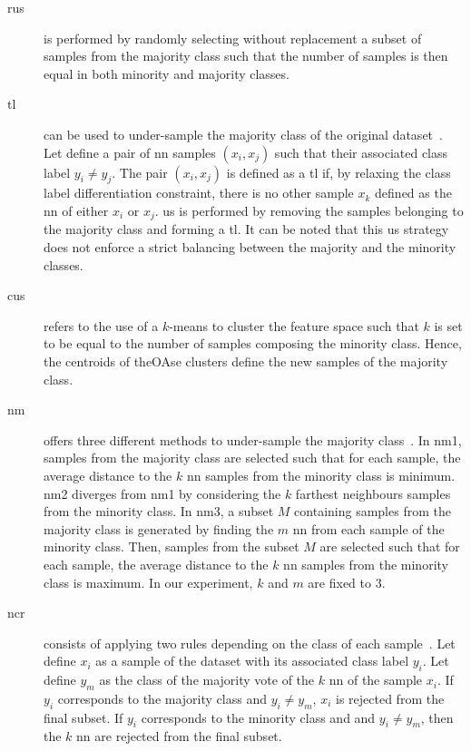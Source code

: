 \begin{description}
  \item[\Ac{rus}] is performed by randomly selecting without replacement a subset of samples from the majority class such that the number of samples is then equal in both minority and majority classes.
  \item[\Ac{tl}] can be used to under-sample the majority class of the original dataset~\cite{tomek1976two}.
Let define a pair of \ac{nn} samples $(x_i, x_j)$ such that their associated class label $y_i \neq y_j$.
The pair $(x_i, x_j)$ is defined as a \ac{tl} if, by relaxing the class label differentiation constraint, there is no other sample $x_k$ defined as the \ac{nn} of either $x_i$ or $x_j$.
\Ac{us} is performed by removing the samples belonging to the majority class and forming a \ac{tl}.
It can be noted that this \ac{us} strategy does not enforce a strict balancing between the majority and the minority classes.
  \item[\Ac{cus}] refers to the use of a $k$-means to cluster the feature space such that $k$ is set to be equal to the number of samples composing the minority class.
Hence, the centroids of theOAse clusters define the new samples of the majority class. 
  \item[\Ac{nm}] offers three different methods to under-sample the majority class~\cite{mani2003knn}.
In \ac{nm1}, samples from the majority class are selected such that for each sample, the average distance to the $k$ \ac{nn} samples from the minority class is minimum.
\ac{nm2} diverges from \ac{nm1} by considering the $k$ farthest neighbours samples from the minority class.
In \ac{nm3}, a subset $M$ containing samples from the majority class is generated by finding the $m$ \ac{nn} from each sample of the minority class.
Then, samples from the subset $M$ are selected such that for each sample, the average distance to the $k$ \ac{nn} samples from the minority class is maximum.
In our experiment, $k$ and $m$ are fixed to 3.
  \item[\Ac{ncr}] consists of applying two rules depending on the class of each sample~\cite{laurikkala2001improving}.
Let define $x_i$ as a sample of the dataset with its associated class label $y_i$.
Let define $y_m$ as the class of the majority vote of the $k$ \ac{nn} of the sample $x_i$.
If $y_i$ corresponds to the majority class and $y_i \neq y_m$, $x_i$ is rejected from the final subset.
If $y_i$ corresponds to the minority class and and $y_i \neq y_m$, then the $k$ \ac{nn} are rejected from the final subset.
\end{description}

